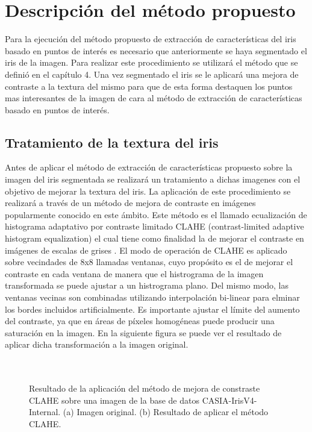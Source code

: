 \section{Descripción del método propuesto}

Para la ejecución del método propuesto de extracción de características del iris basado en puntos de interés es necesario que anteriormente se haya segmentado el iris de la imagen. Para realizar este procedimiento se utilizará el método que se definió en el capítulo 4. Una vez segmentado el iris se le aplicará una mejora de contraste a la textura del mismo para que de esta forma destaquen los puntos mas interesantes de la imagen de cara al método de extracción de características basado en puntos de interés. \\


\subsection{Tratamiento de la textura del iris}

Antes de aplicar el método de extracción de características propuesto sobre la imagen del iris segmentada se realizará un tratamiento a dichas imagenes con el objetivo de mejorar la textura del iris. La aplicación de este procedimiento se realizará a través de un método de mejora de contraste en imágenes popularmente conocido en este ámbito.  Este método es el llamado ecualización de histograma adaptativo por contraste limitado CLAHE (contrast-limited adaptive histogram equalization) el cual tiene como finalidad la de mejorar el contraste en imágenes de escalas de grises \cite{Reference22}.  El modo de operación de CLAHE es aplicado sobre vecindades de 8x8 llamadas ventanas, cuyo propósito es el de mejorar el contraste en cada ventana de manera que el histrograma de la imagen transformada se puede ajustar a un histrograma plano. Del mismo modo, las ventanas vecinas son combinadas utilizando interpolación bi-linear para elminar los bordes incluidos artificialmente. Es importante ajustar el límite del aumento del contraste, ya que en áreas de píxeles homogéneas puede producir una saturación en la imagen. En la siguiente figura se puede ver el resultado de aplicar dicha transformación a la imagen original.\\ \\ \\

\begin{figure}[htbp]
\centering
{}
\caption{Resultado de la aplicación del método de mejora de constraste CLAHE sobre una imagen de la base de datos CASIA-IrisV4-Internal. (a) Imagen original. (b) Resultado de aplicar el método CLAHE.} \label{fig:señales}
\end{figure}


